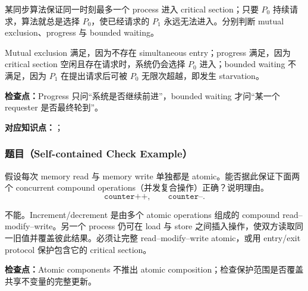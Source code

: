 某同步算法保证同一时刻最多一个 process 进入 critical section；只要 $P_0$ 持续请求，算法就总是选择 $P_0$，使已经请求的 $P_1$ 永远无法进入。分别判断 mutual exclusion、progress 与 bounded waiting。

\begin{checkedsolution}
Mutual exclusion 满足，因为不存在 simultaneous entry；progress 满足，因为 critical section 空闲且存在请求时，系统仍会选择 $P_0$ 进入；bounded waiting 不满足，因为 $P_1$ 在提出请求后可被 $P_0$ 无限次超越，即发生 starvation。
\end{checkedsolution}

\textbf{检查点：}Progress 只问“系统是否继续前进”，bounded waiting 才问“某一个 requester 是否最终轮到”。


\textbf{对应知识点：}；

\subsubsection*{题目（Self-contained Check Example）}

假设每次 memory read 与 memory write 单独都是 atomic。能否据此保证下面两个 concurrent compound operations（并发复合操作）正确？说明理由。
\[
  \texttt{counter++},\qquad \texttt{counter--}.
\]

\begin{checkedsolution}
不能。Increment/decrement 是由多个 atomic operations 组成的 compound read--modify--write。另一个 process 仍可在 load 与 store 之间插入操作，使双方读取同一旧值并覆盖彼此结果。必须让完整 read--modify--write atomic，或用 entry/exit protocol 保护包含它的 critical section。
\end{checkedsolution}

\textbf{检查点：}Atomic components 不推出 atomic composition；检查保护范围是否覆盖共享不变量的完整更新。

